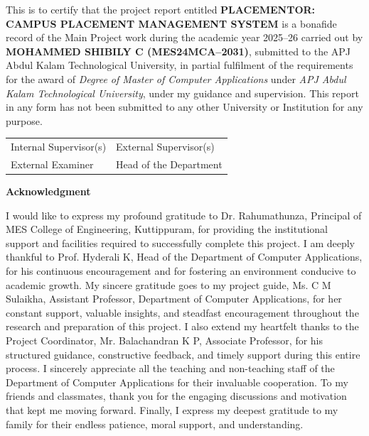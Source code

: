 \documentclass[a4paper,12pt]{report}
\begin{document}
\normalsize
\noindent
This is to certify that the project report entitled \textbf{PLACEMENTOR: CAMPUS PLACEMENT MANAGEMENT SYSTEM} is a bonafide record of the Main Project work during the academic year 2025--26 carried out by \textbf{MOHAMMED SHIBILY C (MES24MCA--2031)}, submitted to the APJ Abdul Kalam Technological University, in partial fulfilment of the requirements for the award of \textit{Degree of Master of Computer Applications} under \textit{APJ Abdul Kalam Technological University}, under my guidance and supervision. This report in any form has not been submitted to any other University or Institution for any purpose.

\vspace{1.5cm}

\begin{tabular}{p{7cm} p{7cm}}
Internal Supervisor(s) & External Supervisor(s) \\[3cm]
External Examiner & Head of the Department \\
\end{tabular}

\newpage


\onehalfspacing 

\begin{center}
    \Large\textbf{Acknowledgment}
\end{center}

\noindent I would like to express my profound gratitude to Dr. Rahumathunza, Principal of MES College of Engineering, Kuttippuram, for providing the institutional support and facilities required to successfully complete this project. I am deeply thankful to Prof. Hyderali K, Head of the Department of Computer Applications, for his continuous encouragement and for fostering an environment conducive to academic growth. My sincere gratitude goes to my project guide, Ms. C M Sulaikha, Assistant Professor, Department of Computer Applications, for her constant support, valuable insights, and steadfast encouragement throughout the research and preparation of this project. I also extend my heartfelt thanks to the Project Coordinator, Mr. Balachandran K P, Associate Professor, for his structured guidance, constructive feedback, and timely support during this entire process. I sincerely appreciate all the teaching and non-teaching staff of the Department of Computer Applications for their invaluable cooperation. To my friends and classmates, thank you for the engaging discussions and motivation that kept me moving forward. Finally, I express my deepest gratitude to my family for their endless patience, moral support, and understanding.
\end{document}
